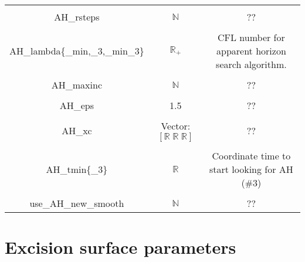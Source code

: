 \documentclass{article}
\begin{document}
\begin{table}[h]
\begin{tabular}{ccc}
      \\ \\
      AH\_rsteps &
      $\mathbb{N}$
      &
      ??
      \\ \\
      AH\_lambda\{\_min,\_3,\_min\_3\}
      &
      $\mathbb{R}_+$
      &
      CFL number for apparent horizon search algorithm.
      \\ \\
      AH\_maxinc 
      &
      $\mathbb{N}$
      &
      ??
      \\ \\
      AH\_eps 
      &
      1.5
      &
      ??
      \\ \\
      AH\_xc &
      Vector: $\left[ 
         \mathbb{R} \; \mathbb{R} \; \mathbb{R} 
      \right]$
      &
      ??
      \\ \\ 
      AH\_tmin\{\_3\} 
      &
      $\mathbb{R}$
      &
      Coordinate time to start looking for AH (\#3)
      \\ \\ 
      use\_AH\_new\_smooth
      &
      $\mathbb{N}$
      &
      ??
   \end{tabular}
\end{table}

\newpage
\section*{Excision surface parameters}
\end{document}
